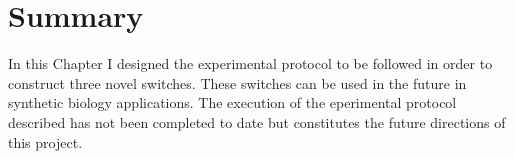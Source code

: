 


\clearpage
\section{Summary}

In this Chapter I designed the experimental protocol to be followed in order to construct three novel switches. These switches can be used in the future in synthetic biology applications. The execution of the eperimental protocol described has not been completed to date but constitutes the future directions of this project.

